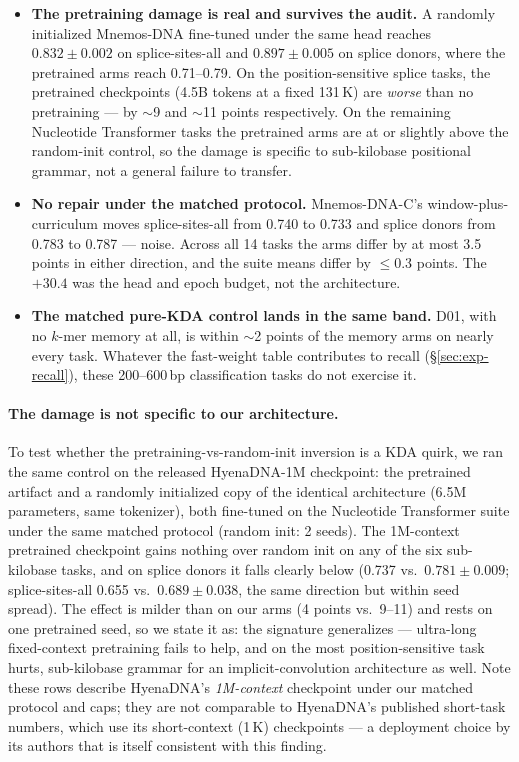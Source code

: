 \documentclass[11pt]{article}
\theoremstyle{plain}
\begin{document}
\begin{itemize}
\item \textbf{The pretraining damage is real and survives the audit.} A randomly initialized
Mnemos-DNA fine-tuned under the same head reaches $0.832\pm0.002$ on splice-sites-all and
$0.897\pm0.005$ on splice donors, where the pretrained arms reach 0.71--0.79. On the
position-sensitive splice tasks, the pretrained checkpoints (4.5B tokens at a fixed 131\,K) are
\emph{worse} than no pretraining --- by $\sim$9 and $\sim$11 points respectively. On the
remaining Nucleotide Transformer tasks the pretrained arms are at or slightly above the
random-init control, so the damage is specific to sub-kilobase positional grammar, not a general
failure to transfer.
\item \textbf{No repair under the matched protocol.} Mnemos-DNA-C's window-plus-curriculum moves
splice-sites-all from 0.740 to 0.733 and splice donors from 0.783 to 0.787 --- noise. Across all
14 tasks the arms differ by at most 3.5 points in either direction, and the suite means differ
by $\le$0.3 points. The $+30.4$ was the head and epoch budget, not the architecture.
\item \textbf{The matched pure-KDA control lands in the same band.} D01, with no $k$-mer memory
at all, is within $\sim$2 points of the memory arms on nearly every task. Whatever the
fast-weight table contributes to recall (\S\ref{sec:exp-recall}), these 200--600\,bp
classification tasks do not exercise it.
\end{itemize}

\paragraph{The damage is not specific to our architecture.} To test whether the
pretraining-vs-random-init inversion is a KDA quirk, we ran the same control on the released
HyenaDNA-1M checkpoint: the pretrained artifact and a randomly initialized copy of the
identical architecture (6.5M parameters, same tokenizer), both fine-tuned on the Nucleotide
Transformer suite under the same matched protocol (random init: 2 seeds). The 1M-context
pretrained checkpoint gains nothing over random init on any of the six sub-kilobase tasks, and
on splice donors it falls clearly below (0.737 vs.\ $0.781\pm0.009$; splice-sites-all 0.655
vs.\ $0.689\pm0.038$, the same direction but within seed spread). The effect is milder than on
our arms (4 points vs.\ 9--11) and rests on one pretrained seed, so we state it as: the
signature generalizes --- ultra-long fixed-context pretraining fails to help, and on the most
position-sensitive task hurts, sub-kilobase grammar for an implicit-convolution architecture as
well. Note these rows describe HyenaDNA's \emph{1M-context} checkpoint under our matched
protocol and caps; they are not comparable to HyenaDNA's published short-task numbers, which
use its short-context (1\,K) checkpoints --- a deployment choice by its authors that is itself
consistent with this finding.
\end{document}

